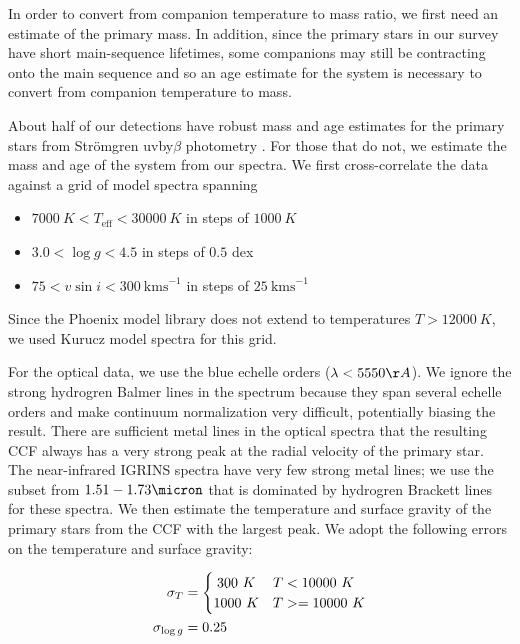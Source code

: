 \documentclass{emulateapj}
\begin{document}
In order to convert from companion temperature to mass ratio, we first need an estimate of the primary mass. In addition, since the primary stars in our survey have short main-sequence lifetimes, some companions may still be contracting onto the main sequence and so an age estimate for the system is necessary to convert from companion temperature to mass.

About half of our detections have robust mass and age estimates for the primary stars from Str\"omgren uvby$\beta$ photometry \citep{David2015}. For those that do not, we estimate the mass and age of the system from our spectra. We first cross-correlate the data against a grid of model spectra spanning

\begin{itemize}
\item $7000\ K < T_\mathrm{eff} < 30000\ K$ in steps of $1000\ K$
\item $3.0 < \log{g} < 4.5$ in steps of $0.5$ dex
\item $75 < v\sin{i} < 300\ \mathrm{km s}^{-1}$ in steps of $25\ \mathrm{km s}^{-1}$
\end{itemize}
Since the Phoenix model library does not extend to temperatures $T > 12000\ K$, we used Kurucz model spectra \citep{Castelli2003} for this grid. 

For the optical data, we use the blue echelle orders ($\lambda < 5550 \AA$). We ignore the strong hydrogren Balmer lines in the spectrum because they span several echelle orders and make continuum normalization very difficult, potentially biasing the result. There are sufficient metal lines in the optical spectra that the resulting CCF always has a very strong peak at the radial velocity of the primary star. The near-infrared IGRINS spectra have very few strong metal lines; we use the subset from $1.51 - 1.73 \micron$ that is dominated by hydrogren Brackett lines for these spectra. We then estimate the temperature and surface gravity of the primary stars from the CCF with the largest peak. We adopt the following errors on the temperature and surface gravity:

\begin{align}
 \sigma_T &= \begin{cases}
      \hfill 300\ K \hfill & T < 10000\ K \\
      \hfill 1000\ K \hfill & T >= 10000\ K \\
     \end{cases} \\
 \sigma_{\log{g}} &= 0.25
\end{align}
\end{document}

